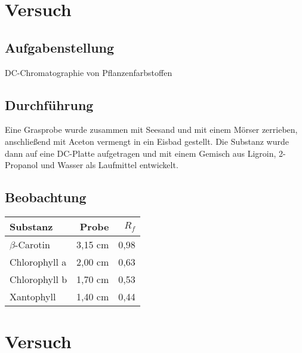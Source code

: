 \documentclass[10pt]{scrartcl}
\begin{document}
\section{Versuch}
\subsection{Aufgabenstellung}
DC-Chromatographie von Pflanzenfarbstoffen
\subsection{Durchführung}
Eine Grasprobe wurde zusammen mit Seesand und  mit einem Mörser zerrieben, anschließend mit Aceton vermengt in ein Eisbad gestellt. Die Substanz wurde dann auf eine DC-Platte aufgetragen und mit einem Gemisch aus Ligroin, 2-Propanol und Wasser als Laufmittel entwickelt. 
\subsection{Beobachtung}
\begin{minipage}{.45\textwidth}
\end{minipage}
\hfill
\begin{minipage}{.45\textwidth}
	\begin{tabular}{l r r}
		Substanz & Probe & $R_f$ \\ \hline
		$\beta$-Carotin & 3,15 cm & 0,98\\
		Chlorophyll a & 2,00 cm & 0,63\\
		Chlorophyll b & 1,70 cm & 0,53\\
		Xantophyll & 1,40 cm & 0,44\\
	\end{tabular}
\end{minipage}
\section{Versuch}
\end{document}
